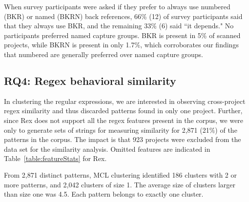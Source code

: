 When survey participants were asked if they prefer to always use numbered (BKR) or named (BKRN) back references, 66\% (12) of survey participants said that they always use BKR, and the remaining 33\% (6) said ``it depends."  No participants preferred named capture groups.  BKR is present in 5\% of scanned projects, while BKRN is present in only 1.7\%, which corroborates our findings that numbered  are generally preferred over named capture groups.

\subsection{RQ4: Regex behavioral similarity}
\label{rq4:results}


In clustering the regular expressions, we are interested in observing cross-project regex similarity and thus discarded patterns found in only one project.
Further, since Rex does not support all the regex features present in the corpus, we were only to generate sets of strings for measuring similarity for 2,871 (21\%) of the  patterns in the corpus. The impact is that 923 projects were excluded from the data set for the similarity analysis. Omitted features are indicated in Table~\ref{table:featureStats} for Rex. 




From 2,871 distinct patterns, MCL clustering identified 186 clusters with 2 or more patterns, and 2,042 clusters of size 1.  
 The average size of clusters larger than size one was 4.5.  Each pattern belongs to exactly one cluster.

